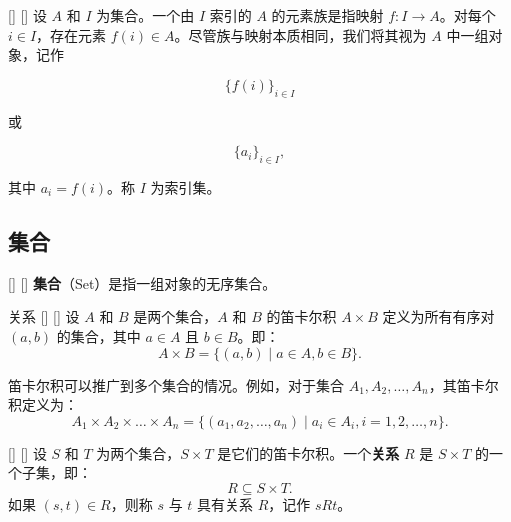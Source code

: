 \documentclass[UTF8]{ctexart}
\begin{document}
        \begin{dfn}
            []
            {}
            []
            []
            设 \( A \) 和 \( I \) 为集合。一个由 \( I \) 索引的 \( A \) 的元素族是指映射 \( f: I \to A \)。对每个 \( i \in I \)，存在元素 \( f(i) \in A \)。尽管族与映射本质相同，我们将其视为 \( A \) 中一组对象，记作

            \[
            \{f(i)\}_{i \in I}
            \]

            或

            \[
            \{a_i\}_{i \in I},
            \]

            其中 \( a_i = f(i) \)。称 \( I \) 为索引集。
       \end{dfn}

    \subsection{集合}

        \begin{dfn}
            []
            {}
            []
            []
            \textbf{集合}（Set）是指一组对象的无序集合。
       \end{dfn}

		\begin{dfn}
            []
            {关系}
            []
            []
                设 \( A \) 和 \( B \) 是两个集合，\( A \) 和 \( B \) 的笛卡尔积 \( A \times B \) 定义为所有有序对 \( (a, b) \) 的集合，其中 \( a \in A \) 且 \( b \in B \)。即：
            \[
            A \times B = \{(a, b) \mid a \in A, b \in B\}.
            \]

                笛卡尔积可以推广到多个集合的情况。例如，对于集合 \( A_1, A_2, \dots, A_n \)，其笛卡尔积定义为：
            \[
            A_1 \times A_2 \times \dots \times A_n = \{(a_1, a_2, \dots, a_n) \mid a_i \in A_i, i = 1, 2, \dots, n\}.
            \]
        \end{dfn}

		\begin{dfn}
            []
            {}
            []
            []
			设 \( S \) 和 \( T \) 为两个集合，\( S \times T \) 是它们的笛卡尔积。一个\textbf{关系} \( R \) 是 \( S \times T \) 的一个子集，即：
			\[
			R \subseteq S \times T.
			\]
			如果 \( (s, t) \in R \)，则称 \( s \) 与 \( t \) 具有关系 \( R \)，记作 \( sRt \)。
		\end{dfn}
\end{document}
